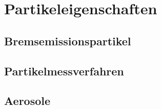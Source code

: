 \section{Partikeleigenschaften}

\subsection{Bremsemissionspartikel}

\subsection{Partikelmessverfahren}

\subsection{Aerosole}
